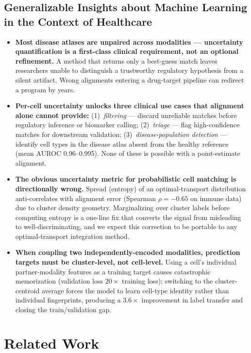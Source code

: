 \documentclass[pmlr]{jmlr}
\begin{document}
\subsection*{Generalizable Insights about Machine Learning in the Context of Healthcare}

\begin{itemize}
  \item \textbf{Most disease atlases are unpaired across modalities --- uncertainty quantification is a first-class clinical requirement, not an optional refinement.} A method that returns only a best-guess match leaves researchers unable to distinguish a trustworthy regulatory hypothesis from a silent artifact. Wrong alignments entering a drug-target pipeline can redirect a program by years.
  \item \textbf{Per-cell uncertainty unlocks three clinical use cases that alignment alone cannot provide:} (1)~\emph{filtering} --- discard unreliable matches before regulatory inference or biomarker calling; (2)~\emph{triage} --- flag high-confidence matches for downstream validation; (3)~\emph{disease-population detection} --- identify cell types in the disease atlas absent from the healthy reference (mean AUROC 0.96--0.995). None of these is possible with a point-estimate alignment.
  \item \textbf{The obvious uncertainty metric for probabilistic cell matching is directionally wrong.} Spread (entropy) of an optimal-transport distribution anti-correlates with alignment error (Spearman $\rho = -0.65$ on immune data) due to cluster density geometry. Marginalizing over cluster labels before computing entropy is a one-line fix that converts the signal from misleading to well-discriminating, and we expect this correction to be portable to any optimal-transport integration method.
  \item \textbf{When coupling two independently-encoded modalities, prediction targets must be cluster-level, not cell-level.} Using a cell's individual partner-modality features as a training target causes catastrophic memorization (validation loss $20\times$ training loss); switching to the cluster-centroid average forces the model to learn cell-type identity rather than individual fingerprints, producing a $3.6\times$ improvement in label transfer and closing the train/validation gap.
\end{itemize}

\section{Related Work}
\label{sec:related}
\end{document}
